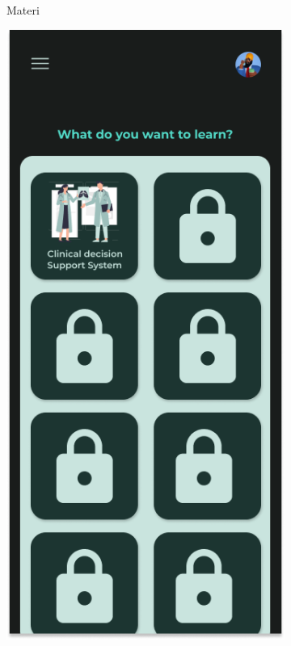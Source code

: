 \begin{figure}[H]
\begin{subfigure}[b]{0.23\textwidth}
	  \caption{Materi}
	  \label{fig:HasilMain3}
	\end{subfigure}
	\begin{subfigure}[b]{0.23\textwidth}
		\centering
	  \includegraphics[width=\linewidth]{contents/chapter-3/images/HF-materi-dt.png}

\end{subfigure}
\end{figure}
